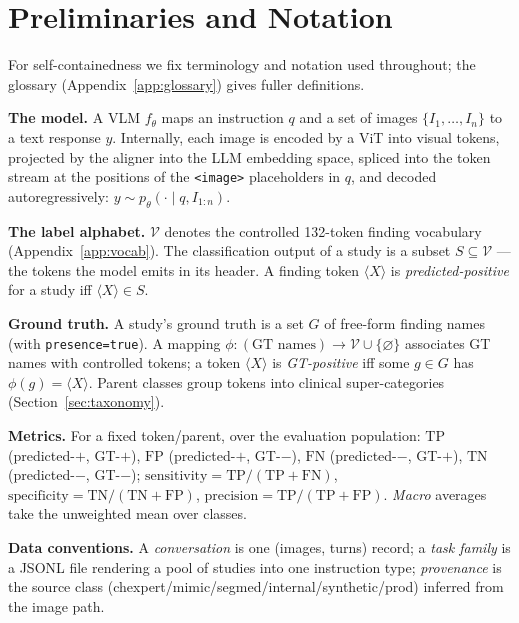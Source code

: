 \documentclass[11pt,a4paper]{article}
\begin{document}
\section{Preliminaries and Notation}
\label{sec:prelim}

For self-containedness we fix terminology and notation used throughout; the glossary (Appendix~\ref{app:glossary}) gives fuller definitions.

\textbf{The model.} A VLM $f_\theta$ maps an instruction $q$ and a set of images $\{I_1,\dots,I_n\}$ to a text response $y$. Internally, each image is encoded by a ViT into visual tokens, projected by the aligner into the LLM embedding space, spliced into the token stream at the positions of the \texttt{<image>} placeholders in $q$, and decoded autoregressively: $y \sim p_\theta(\cdot \mid q, I_{1:n})$.

\textbf{The label alphabet.} $\mathcal{V}$ denotes the controlled 132-token finding vocabulary (Appendix~\ref{app:vocab}). The classification output of a study is a subset $S \subseteq \mathcal{V}$ --- the tokens the model emits in its header. A finding token $\langle X\rangle$ is \emph{predicted-positive} for a study iff $\langle X\rangle \in S$.

\textbf{Ground truth.} A study's ground truth is a set $G$ of free-form finding names (with \texttt{presence=true}). A mapping $\phi: (\text{GT names}) \to \mathcal{V}\cup\{\varnothing\}$ associates GT names with controlled tokens; a token $\langle X\rangle$ is \emph{GT-positive} iff some $g\in G$ has $\phi(g)=\langle X\rangle$. Parent classes group tokens into clinical super-categories (Section~\ref{sec:taxonomy}).

\textbf{Metrics.} For a fixed token/parent, over the evaluation population: $\mathrm{TP}$ (predicted-$+$, GT-$+$), $\mathrm{FP}$ (predicted-$+$, GT-$-$), $\mathrm{FN}$ (predicted-$-$, GT-$+$), $\mathrm{TN}$ (predicted-$-$, GT-$-$); $\text{sensitivity}=\mathrm{TP}/(\mathrm{TP}{+}\mathrm{FN})$, $\text{specificity}=\mathrm{TN}/(\mathrm{TN}{+}\mathrm{FP})$, $\text{precision}=\mathrm{TP}/(\mathrm{TP}{+}\mathrm{FP})$. \emph{Macro} averages take the unweighted mean over classes.

\textbf{Data conventions.} A \emph{conversation} is one (images, turns) record; a \emph{task family} is a JSONL file rendering a pool of studies into one instruction type; \emph{provenance} is the source class (chexpert/mimic/segmed/internal/synthetic/prod) inferred from the image path.
\end{document}
